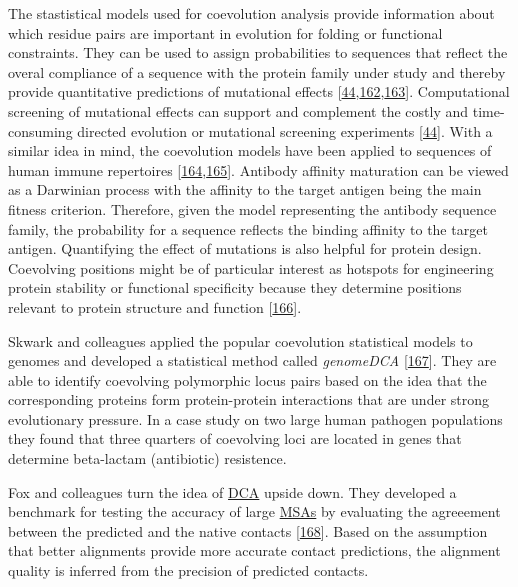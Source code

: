 \documentclass[11pt,a4paper,twoside]{book}
\theoremstyle{definition}
\theoremstyle{definition}
\theoremstyle{remark}
\begin{document}
The stastistical models used for coevolution analysis provide
information about which residue pairs are important in evolution for
folding or functional constraints. They can be used to assign
probabilities to sequences that reflect the overal compliance of a
sequence with the protein family under study and thereby provide
quantitative predictions of mutational effects
{[}\protect\hyperlink{ref-Hopf2017}{44},\protect\hyperlink{ref-Wu2016}{162},\protect\hyperlink{ref-Figliuzzi2015}{163}{]}.
Computational screening of mutational effects can support and complement
the costly and time-consuming directed evolution or mutational screening
experiments {[}\protect\hyperlink{ref-Hopf2017}{44}{]}. With a similar
idea in mind, the coevolution models have been applied to sequences of
human immune repertoires
{[}\protect\hyperlink{ref-Asti2016}{164},\protect\hyperlink{ref-Elhanati2014}{165}{]}.
Antibody affinity maturation can be viewed as a Darwinian process with
the affinity to the target antigen being the main fitness criterion.
Therefore, given the model representing the antibody sequence family,
the probability for a sequence reflects the binding affinity to the
target antigen. Quantifying the effect of mutations is also helpful for
protein design. Coevolving positions might be of particular interest as
hotspots for engineering protein stability or functional specificity
because they determine positions relevant to protein structure and
function {[}\protect\hyperlink{ref-Franceus2016}{166}{]}.

Skwark and colleagues applied the popular coevolution statistical models
to genomes and developed a statistical method called \emph{genomeDCA}
{[}\protect\hyperlink{ref-Skwark2017}{167}{]}. They are able to identify
coevolving polymorphic locus pairs based on the idea that the
corresponding proteins form protein-protein interactions that are under
strong evolutionary pressure. In a case study on two large human
pathogen populations they found that three quarters of coevolving loci
are located in genes that determine beta-lactam (antibiotic) resistence.

Fox and colleagues turn the idea of \protect\hyperlink{abbrev}{DCA}
upside down. They developed a benchmark for testing the accuracy of
large \protect\hyperlink{abbrev}{MSAs} by evaluating the agreeement
between the predicted and the native contacts
{[}\protect\hyperlink{ref-Fox2016}{168}{]}. Based on the assumption that
better alignments provide more accurate contact predictions, the
alignment quality is inferred from the precision of predicted contacts.
\end{document}

